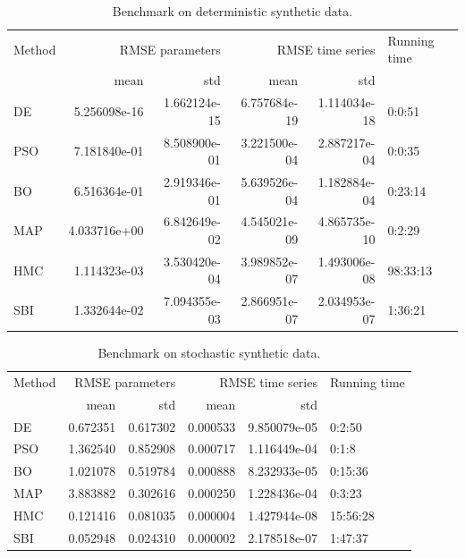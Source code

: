 \documentclass[preprint,11pt,authoryear]{elsarticle}
\begin{document}
\clearpage

\begin{table}[p]
    \centering
    \begin{tabular}{lrrrrl}
    {Method} & \multicolumn{2}{r}{RMSE parameters} & \multicolumn{2}{r}{RMSE time series} & Running time \\
    {} &            mean &           std &             mean & std \\
    \midrule
    DE     &    5.256098e-16 &  1.662124e-15 &     6.757684e-19 &  1.114034e-18 &       0:0:51 \\
    PSO    &    7.181840e-01 &  8.508900e-01 &     3.221500e-04 &  2.887217e-04 &       0:0:35 \\
    BO     &    6.516364e-01 &  2.919346e-01 &     5.639526e-04 &  1.182884e-04 &      0:23:14 \\
    MAP    &    4.033716e+00 &  6.842649e-02 &     4.545021e-09 &  4.865735e-10 &       0:2:29 \\
    HMC    &    1.114323e-03 &  3.530420e-04 &     3.989852e-07 &  1.493006e-08 &     98:33:13 \\
    SBI    &    1.332644e-02 &  7.094355e-03 &     2.866951e-07 &  2.034953e-07 &      1:36:21 \\
    \end{tabular}
\caption{Benchmark on deterministic synthetic data.}
\label{tab:ODEdata}
\end{table}




\begin{table}[p]
    \centering
    \begin{tabular}{lrrrrl}
    {Method} & \multicolumn{2}{r}{RMSE parameters} & \multicolumn{2}{r}{RMSE time series} & Running time \\
    {} &            mean &       std &             mean & std \\
    \midrule
    DE     &        0.672351 &  0.617302 &         0.000533 &  9.850079e-05 &       0:2:50 \\
    PSO    &        1.362540 &  0.852908 &         0.000717 &  1.116449e-04 &        0:1:8 \\
    BO     &        1.021078 &  0.519784 &         0.000888 &  8.232933e-05 &      0:15:36 \\
    MAP    &        3.883882 &  0.302616 &         0.000250 &  1.228436e-04 &       0:3:23 \\
    HMC    &        0.121416 &  0.081035 &         0.000004 &  1.427944e-08 &     15:56:28 \\
    SBI    &        0.052948 &  0.024310 &         0.000002 &  2.178518e-07 &      1:47:37 \\
\end{tabular}
\caption{Benchmark on stochastic synthetic data.}
\label{tab:SDEdata}
\end{table}
\end{document}
